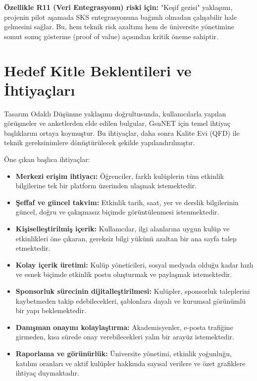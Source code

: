 \documentclass[a4paper,12pt]{report}
\begin{document}
\textbf{Özellikle R11 (Veri Entegrasyonu) riski için:} "Keşif gezisi" yaklaşımı, projenin pilot aşamada SKS entegrasyonuna bağımlı olmadan çalışabilir hale gelmesini sağlar. Bu, hem teknik risk azaltımı hem de üniversite yönetimine somut sonuç gösterme (proof of value) açısından kritik öneme sahiptir.


\section{Hedef Kitle Beklentileri ve İhtiyaçları}

Tasarım Odaklı Düşünme yaklaşımı doğrultusunda, kullanıcılarla yapılan görüşmeler ve anketlerden elde edilen bulgular, GsuNET için temel ihtiyaç başlıklarını ortaya koymuştur. Bu ihtiyaçlar, daha sonra Kalite Evi (QFD) ile teknik gereksinimlere dönüştürülecek şekilde yapılandırılmıştır.

Öne çıkan başlıca ihtiyaçlar:

\begin{itemize}
    \item \textbf{Merkezi erişim ihtiyacı:} Öğrenciler, farklı kulüplerin tüm etkinlik bilgilerine tek bir platform üzerinden ulaşmak istemektedir.

    \item \textbf{Şeffaf ve güncel takvim:} Etkinlik tarih, saat, yer ve derslik bilgilerinin güncel, doğru ve çakışmasız biçimde görüntülenmesi istenmektedir.

    \item \textbf{Kişiselleştirilmiş içerik:} Kullanıcılar, ilgi alanlarına uygun kulüp ve etkinlikleri öne çıkaran, gereksiz bilgi yükünü azaltan bir ana sayfa talep etmektedir.

    \item \textbf{Kolay içerik üretimi:} Kulüp yöneticileri, sosyal medyada olduğu kadar hızlı ve esnek biçimde etkinlik postu oluşturmak ve paylaşmak istemektedir.

    \item \textbf{Sponsorluk sürecinin dijitalleştirilmesi:} Kulüpler, sponsorluk taleplerini kaybetmeden takip edebilecekleri, şablonlara dayalı ve kurumsal görünümlü bir yapı beklemektedir.

    \item \textbf{Danışman onayını kolaylaştırma:} Akademisyenler, e-posta trafiğine girmeden, kısa sürede onay verebilecekleri yalın bir arayüz istemektedir.

    \item \textbf{Raporlama ve görünürlük:} Üniversite yönetimi, etkinlik yoğunluğu, katılım oranları ve aktif kulüpler hakkında sayısal verilere ve özet grafiklere ihtiyaç duymaktadır.
\end{itemize}
\end{document}
